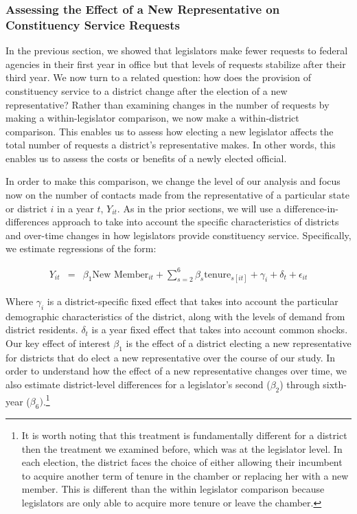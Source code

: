 \documentclass[12pt]{article}
\begin{document}
\subsubsection{Assessing the Effect of a New Representative on Constituency Service Requests}\label{s:tenure_dist}

In the previous section, we showed that legislators make fewer requests to federal agencies in their first year in office but that levels of requests stabilize after their third year. We now turn to a related question: how does the provision of constituency service to a district change after the election of a new representative? Rather than examining changes in the number of requests by making a within-legislator comparison, we now make a within-district comparison. This enables us to assess how electing a new legislator affects the total number of requests a district's representative makes. In other words, this enables us to assess the costs or benefits of a newly elected official. 


In order to make this comparison, we change the level of our analysis and focus now on the number of contacts made from the representative of a particular state or district $i$ in a year $t$, $Y_{it}$. As in the prior sections, we will use a difference-in-differences approach to take into account the specific characteristics of districts and over-time changes in how legislators provide constituency service. Specifically, we estimate regressions of the form: 


\begin{eqnarray}
Y_{it} & = & \beta_{1}\text{New Member}_{it} + \sum_{s = 2}^{6} \beta_{s} \text{tenure}_{s[it]} + \gamma_{i} + \delta_{t} + \epsilon_{it} \label{e:district1} 
\end{eqnarray}

Where $\gamma_{i}$ is a district-specific fixed effect that takes into account the particular demographic characteristics of the district, along with the levels of demand from district residents. $\delta_{t}$ is a year fixed effect that takes into account common shocks. Our key effect of interest $\beta_{1}$ is the effect of a district electing a new representative for districts that do elect a new representative over the course of our study. In order to understand how the effect of a new representative changes over time, we also estimate district-level differences for a legislator's second ($\beta_{2}$) through sixth-year ($\beta_{6})$.\footnote{It is worth noting that this treatment is fundamentally different for a district then the treatment we examined before, which was at the legislator level. In each election, the district faces the choice of either allowing their incumbent to acquire another term of tenure in the chamber or replacing her with a new member. This is different than the within legislator comparison because legislators are only able to acquire more tenure or leave the chamber.}
\end{document}
